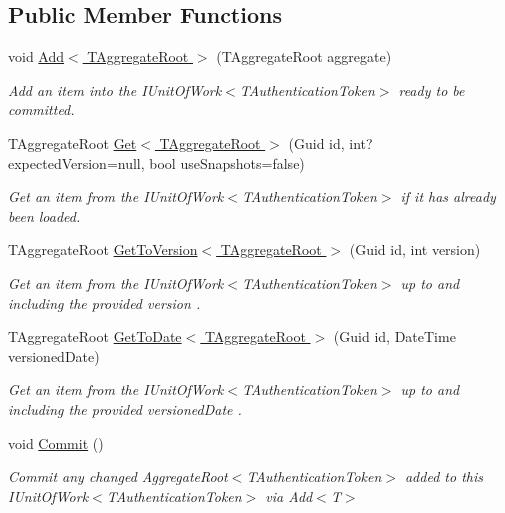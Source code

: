 \subsection*{Public Member Functions}
\begin{DoxyCompactItemize}
\item 
void \hyperlink{interfaceCqrs_1_1Domain_1_1IUnitOfWork_a786ebca85b4ef7294b98280230ef1397_a786ebca85b4ef7294b98280230ef1397}{Add$<$ T\+Aggregate\+Root $>$} (T\+Aggregate\+Root aggregate)
\begin{DoxyCompactList}\small\item\em Add an item into the I\+Unit\+Of\+Work$<$\+T\+Authentication\+Token$>$ ready to be committed. \end{DoxyCompactList}\item 
T\+Aggregate\+Root \hyperlink{interfaceCqrs_1_1Domain_1_1IUnitOfWork_aee78f81d472577a65356bc1c05207180_aee78f81d472577a65356bc1c05207180}{Get$<$ T\+Aggregate\+Root $>$} (Guid id, int? expected\+Version=null, bool use\+Snapshots=false)
\begin{DoxyCompactList}\small\item\em Get an item from the I\+Unit\+Of\+Work$<$\+T\+Authentication\+Token$>$ if it has already been loaded. \end{DoxyCompactList}\item 
T\+Aggregate\+Root \hyperlink{interfaceCqrs_1_1Domain_1_1IUnitOfWork_a449dde9a112fcce6aaab0e4c8b3b9a71_a449dde9a112fcce6aaab0e4c8b3b9a71}{Get\+To\+Version$<$ T\+Aggregate\+Root $>$} (Guid id, int version)
\begin{DoxyCompactList}\small\item\em Get an item from the I\+Unit\+Of\+Work$<$\+T\+Authentication\+Token$>$ up to and including the provided {\itshape version} . \end{DoxyCompactList}\item 
T\+Aggregate\+Root \hyperlink{interfaceCqrs_1_1Domain_1_1IUnitOfWork_a9878de7ddb925b1ef2193b8734d79a3a_a9878de7ddb925b1ef2193b8734d79a3a}{Get\+To\+Date$<$ T\+Aggregate\+Root $>$} (Guid id, Date\+Time versioned\+Date)
\begin{DoxyCompactList}\small\item\em Get an item from the I\+Unit\+Of\+Work$<$\+T\+Authentication\+Token$>$ up to and including the provided {\itshape versioned\+Date} . \end{DoxyCompactList}\item 
void \hyperlink{interfaceCqrs_1_1Domain_1_1IUnitOfWork_ade600c9bf9e8380c24eaf1e7e0df6e01_ade600c9bf9e8380c24eaf1e7e0df6e01}{Commit} ()
\begin{DoxyCompactList}\small\item\em Commit any changed Aggregate\+Root$<$\+T\+Authentication\+Token$>$ added to this I\+Unit\+Of\+Work$<$\+T\+Authentication\+Token$>$ via Add$<$\+T$>$ \end{DoxyCompactList}\end{DoxyCompactItemize}


